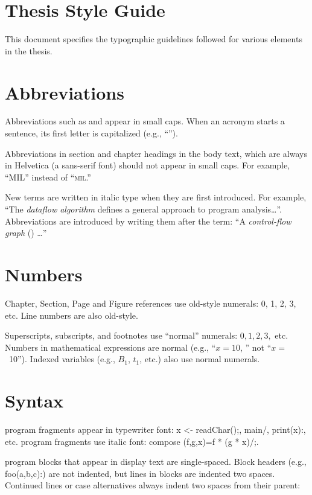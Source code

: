 \fancyhf{}
\numbersoff


\section*{Thesis Style Guide}

This document specifies the typographic guidelines followed for various
elements in the thesis. 

\section*{Abbreviations}
Abbreviations such as \mil and \cfg appear in small caps. When an
acronym starts a sentence, its first letter is capitalized (e.g.,
``\Mil'').

Abbreviations in section and chapter headings in the body text, which are always
in Helvetica (a sans-serif font) should not
appear in small caps. For example, ``\textsf{MIL}'' instead of ``\textsf{\textsc{mil}}.''

New terms are written in italic type when they are first
introduced. For example, ``The \emph{dataflow algorithm} defines a
general approach to program analysis\dots''. Abbreviations
are introduced by writing them after the term: ``A \emph{control-flow graph}
(\cfg) \dots''

\section*{Numbers}
Chapter, Section, Page and Figure references use old-style numerals:
0, 1, 2, 3, etc.  Line numbers are also old-style.

Superscripts, subscripts, and footnotes use ``normal'' numerals: $0,
1, 2, 3,$ etc.  Numbers in mathematical expressions are normal (e.g.,
``$x = 10$, '' not ``$x = $\ 10'').  Indexed variables (e.g., $B_1$,
$t_1$, etc.) also use normal numerals.

\section*{Syntax}
\Mil program fragments appear in typewriter font: \binds x <- \goto readChar();,
\lab main/, \block print(x):, etc. \lamC program fragments use italic
font: \lcdef compose (f,g,x)=\lcapp f * (g * x)/;.

\Mil program blocks that appear in display text are
single-spaced. Block headers (e.g., \block foo(a,b,c):) are not
indented, but lines in blocks are indented two spaces. Continued lines
or case alternatives always indent two spaces from their parent:

